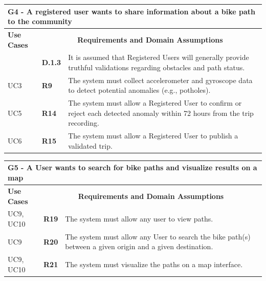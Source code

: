 \begin{longtable}{|p{2.5cm}|p{1cm}|p{10.5cm}|}
\hline
\multicolumn{3}{|p{14.5cm}|}{\centering \textbf{G4 - A registered user wants to share information about a bike path to the community}} \\
\hline
\textbf{Use Cases} & \multicolumn{2}{c|}{\textbf{Requirements and Domain Assumptions}} \\
\hline
& \textbf{D.1.3} & It is assumed that Registered Users will generally provide truthful validations regarding obstacles and path status. \\
\hline
UC3 & \textbf{R9} & The system must collect accelerometer and gyroscope data to detect potential anomalies (e.g., potholes). \\
\hline
UC5 & \textbf{R14} & The system must allow a Registered User to confirm or reject each detected anomaly within 72 hours from the trip recording. \\
\hline
UC6 & \textbf{R15} & The system must allow a Registered User to publish a validated trip. \\
\hline
\end{longtable}

\vspace{0.5cm}

\begin{longtable}{|p{2.5cm}|p{1cm}|p{10.5cm}|}
\hline
\multicolumn{3}{|p{14.5cm}|}{\centering \textbf{G5 - A User wants to search for bike paths and visualize results on a map}} \\
\hline
\textbf{Use Cases} & \multicolumn{2}{c|}{\textbf{Requirements and Domain Assumptions}} \\
\hline
UC9, UC10 & \textbf{R19} & The system must allow any user to view paths. \\
\hline
UC9 & \textbf{R20} & The system must allow any User to search the bike path(s) between a given origin and a given destination. \\
\hline
UC9, UC10 & \textbf{R21} & The system must visualize the paths on a map interface. \\
\hline
\end{longtable}

\vspace{0.5cm}

